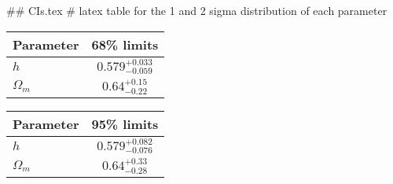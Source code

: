 ## CIs.tex
# latex table for the 1 and 2 sigma distribution of each parameter

\begin{tabular} { l  c}
 Parameter &  68\% limits\\
\hline
{\boldmath$h              $} & $0.579^{+0.033}_{-0.059}   $\\
{\boldmath$\Omega_m       $} & $0.64^{+0.15}_{-0.22}      $\\
\hline
\end{tabular}

\begin{tabular} { l  c}
 Parameter &  95\% limits\\
\hline
{\boldmath$h              $} & $0.579^{+0.082}_{-0.076}   $\\
{\boldmath$\Omega_m       $} & $0.64^{+0.33}_{-0.28}      $\\
\hline
\end{tabular}
